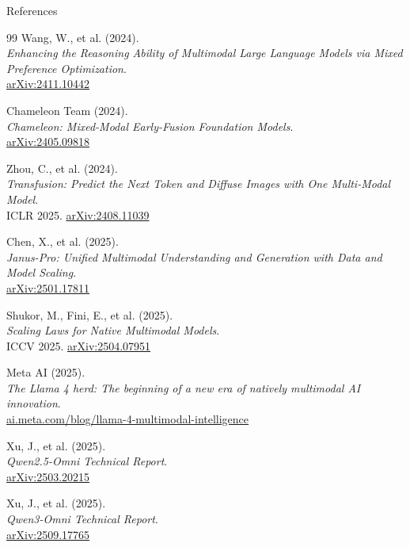 \begin{frame}[allowframebreaks]{References}
\begin{thebibliography}{99}
      Wang, W., et al. (2024). \\
      \emph{Enhancing the Reasoning Ability of Multimodal Large Language Models via Mixed Preference Optimization}.\\
      \href{https://arxiv.org/abs/2411.10442}{arXiv:2411.10442}

      Chameleon Team (2024). \\
      \emph{Chameleon: Mixed-Modal Early-Fusion Foundation Models}.\\
      \href{https://arxiv.org/abs/2405.09818}{arXiv:2405.09818}

      Zhou, C., et al. (2024). \\
      \emph{Transfusion: Predict the Next Token and Diffuse Images with One Multi-Modal Model}.\\
      ICLR 2025. \href{https://arxiv.org/abs/2408.11039}{arXiv:2408.11039}

      Chen, X., et al. (2025). \\
      \emph{Janus-Pro: Unified Multimodal Understanding and Generation with Data and Model Scaling}.\\
      \href{https://arxiv.org/abs/2501.17811}{arXiv:2501.17811}

      Shukor, M., Fini, E., et al. (2025). \\
      \emph{Scaling Laws for Native Multimodal Models}.\\
      ICCV 2025. \href{https://arxiv.org/abs/2504.07951}{arXiv:2504.07951}

      Meta AI (2025). \\
      \emph{The Llama 4 herd: The beginning of a new era of natively multimodal AI innovation}.\\
      \href{https://ai.meta.com/blog/llama-4-multimodal-intelligence/}{ai.meta.com/blog/llama-4-multimodal-intelligence}

      Xu, J., et al. (2025). \\
      \emph{Qwen2.5-Omni Technical Report}.\\
      \href{https://arxiv.org/abs/2503.20215}{arXiv:2503.20215}

      Xu, J., et al. (2025). \\
      \emph{Qwen3-Omni Technical Report}.\\
      \href{https://arxiv.org/abs/2509.17765}{arXiv:2509.17765}


\end{thebibliography}
\end{frame}
